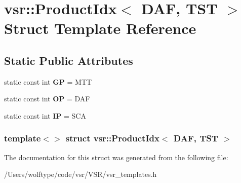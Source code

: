 \hypertarget{structvsr_1_1_product_idx_3_01_d_a_f_00_01_t_s_t_01_4}{\section{vsr\-:\-:Product\-Idx$<$ D\-A\-F, T\-S\-T $>$ Struct Template Reference}
\label{structvsr_1_1_product_idx_3_01_d_a_f_00_01_t_s_t_01_4}
}
\subsection*{Static Public Attributes}
\begin{DoxyCompactItemize}
\item 
\hypertarget{structvsr_1_1_product_idx_3_01_d_a_f_00_01_t_s_t_01_4_a02822fffe0db5e11b1e176a9881a9548}{static const int {\bfseries G\-P} = M\-T\-T}\label{structvsr_1_1_product_idx_3_01_d_a_f_00_01_t_s_t_01_4_a02822fffe0db5e11b1e176a9881a9548}

\item 
\hypertarget{structvsr_1_1_product_idx_3_01_d_a_f_00_01_t_s_t_01_4_ac881f7a5812dd765812f1ec9332876f7}{static const int {\bfseries O\-P} = D\-A\-F}\label{structvsr_1_1_product_idx_3_01_d_a_f_00_01_t_s_t_01_4_ac881f7a5812dd765812f1ec9332876f7}

\item 
\hypertarget{structvsr_1_1_product_idx_3_01_d_a_f_00_01_t_s_t_01_4_a60211365db05a54796902f2ff79aa482}{static const int {\bfseries I\-P} = S\-C\-A}\label{structvsr_1_1_product_idx_3_01_d_a_f_00_01_t_s_t_01_4_a60211365db05a54796902f2ff79aa482}

\end{DoxyCompactItemize}
\subsubsection*{template$<$$>$ struct vsr\-::\-Product\-Idx$<$ D\-A\-F, T\-S\-T $>$}



The documentation for this struct was generated from the following file\-:\begin{DoxyCompactItemize}
\item 
/\-Users/wolftype/code/vsr/\-V\-S\-R/vsr\-\_\-templates.\-h\end{DoxyCompactItemize}
